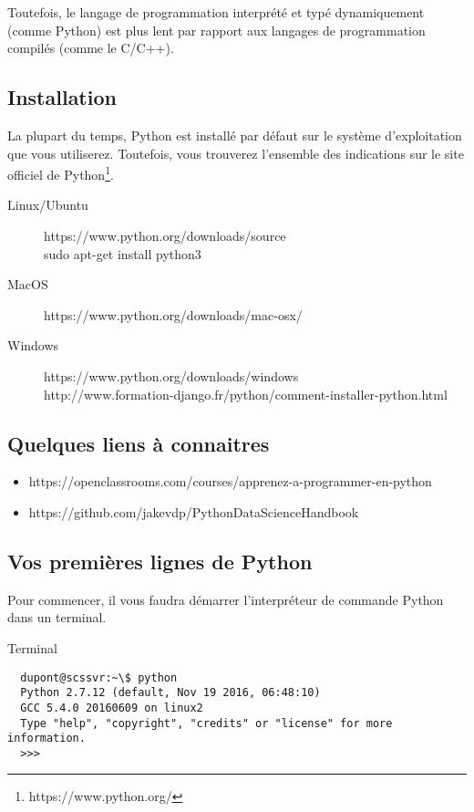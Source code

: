 Toutefois, le langage de programmation interprété et typé dynamiquement (comme Python)
est plus lent par rapport aux langages de programmation compilés (comme le C/C++).


\subsection{Installation}

La plupart du temps, Python est install\'e par d\'efaut sur le syst\`eme d'exploitation que vous utiliserez.
Toutefois, vous trouverez l'ensemble des indications sur le site officiel de Python\footnote{https://www.python.org/}.

\begin{description}
\item [Linux/Ubuntu] https://www.python.org/downloads/source\\
  sudo apt-get install python3

\item [MacOS] https://www.python.org/downloads/mac-osx/\\

\item[Windows] https://www.python.org/downloads/windows\\
  http://www.formation-django.fr/python/comment-installer-python.html
\end{description}



\subsection{Quelques liens à connaitres}

\begin{itemize}
\item[] https://openclassrooms.com/courses/apprenez-a-programmer-en-python
\item[] https://github.com/jakevdp/PythonDataScienceHandbook
\end{itemize}

\subsection{Vos premi\`eres lignes de Python}


Pour commencer, il vous faudra d\'emarrer l'interpr\'eteur de commande Python dans un terminal.

\vskip 2pt
\begin{center}
  \begin{myterminalbox}[colback=gray!10]{Terminal}
\begin{verbatim}
  dupont@scssvr:~\$ python
  Python 2.7.12 (default, Nov 19 2016, 06:48:10)
  GCC 5.4.0 20160609 on linux2
  Type "help", "copyright", "credits" or "license" for more information.
  >>>
\end{verbatim}

  \end{myterminalbox}
\end{center}

